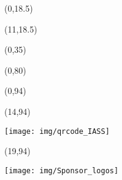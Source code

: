 \documentclass[20pt]{beamer}
\begin{document}
    \begin{frame}

        \begin{textblock}{10.5}(0,18.5)
            
        \end{textblock}

        \begin{textblock}{19}(11,18.5)
            
        \end{textblock}

        \begin{textblock}{30}(0,35)
            
        \end{textblock}

        \begin{textblock}{30}(0,80)
            
        \end{textblock}

        \begin{textblock}{14}(0,94)
            \begin{WhiteBox}
                \vspace{-1cm}
                \begin{block}{}
                    
                    
                \end{block}
            \end{WhiteBox}
        \end{textblock}

        \begin{textblock}{5}(14,94)
            \begin{ClearBox}
                \begin{block}{}
                    \centering
                    \texttt{[image: img/qrcode\_IASS]}
                \end{block}
            \end{ClearBox}
        \end{textblock}

        \begin{textblock}{11}(19,94)
            \begin{WhiteBox}
                \vspace{-1cm}
                \begin{block}{}
                    \texttt{[image: img/Sponsor\_logos]}
                \end{block}
            \end{WhiteBox}
        \end{textblock}
    \end{frame}
\end{document}
